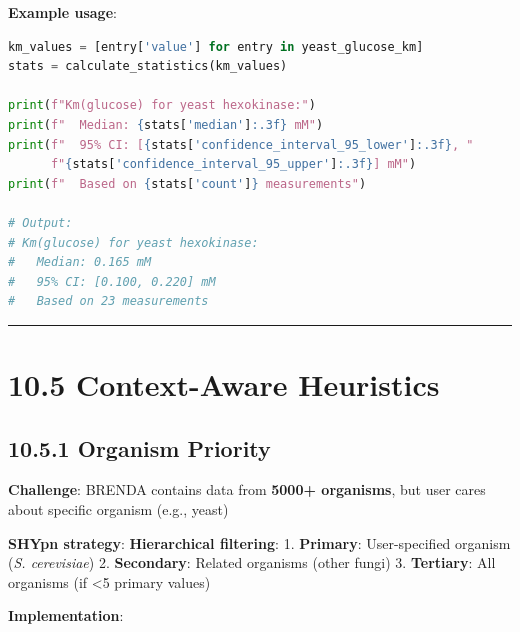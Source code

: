 \textbf{Example usage}:

\begin{lstlisting}[language=Python]
km_values = [entry['value'] for entry in yeast_glucose_km]
stats = calculate_statistics(km_values)

print(f"Km(glucose) for yeast hexokinase:")
print(f"  Median: {stats['median']:.3f} mM")
print(f"  95% CI: [{stats['confidence_interval_95_lower']:.3f}, "
      f"{stats['confidence_interval_95_upper']:.3f}] mM")
print(f"  Based on {stats['count']} measurements")

# Output:
# Km(glucose) for yeast hexokinase:
#   Median: 0.165 mM
#   95% CI: [0.100, 0.220] mM
#   Based on 23 measurements
\end{lstlisting}

\begin{center}\rule{0.5\linewidth}{0.5pt}\end{center}

\hypertarget{context-aware-heuristics}{%
\section{10.5 Context-Aware Heuristics}\label{context-aware-heuristics}}

\hypertarget{organism-priority}{%
\subsection{10.5.1 Organism Priority}\label{organism-priority}}

\textbf{Challenge}: BRENDA contains data from \textbf{5000+ organisms},
but user cares about specific organism (e.g., yeast)

\textbf{SHYpn strategy}: \textbf{Hierarchical filtering}: 1.
\textbf{Primary}: User-specified organism (\emph{S. cerevisiae}) 2.
\textbf{Secondary}: Related organisms (other fungi) 3.
\textbf{Tertiary}: All organisms (if \textless5 primary values)

\textbf{Implementation}:

